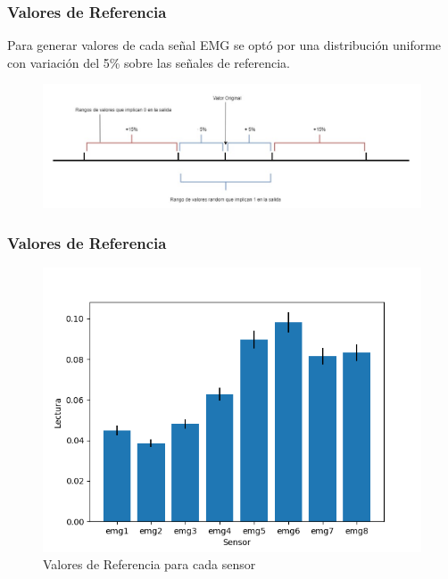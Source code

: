 \documentclass{beamer}
\begin{document}
    \begin{frame}
        \frametitle{Valores de Referencia}
        \hspace*{20pt}Para generar valores de cada señal EMG se optó por una distribución uniforme con 
        variación del 5\% sobre las señales de referencia.
        \begin{figure}
            \centering
            \includegraphics[scale=0.45]{grafico-pela.png}
        \end{figure}
    \end{frame} 

    \begin{frame}
        \frametitle{Valores de Referencia}
        \begin{figure}
            \centering
            \includegraphics[scale=0.4]{plot.png}
            \caption{Valores de Referencia para cada sensor}
        \end{figure}
    \end{frame} 
\end{document}
